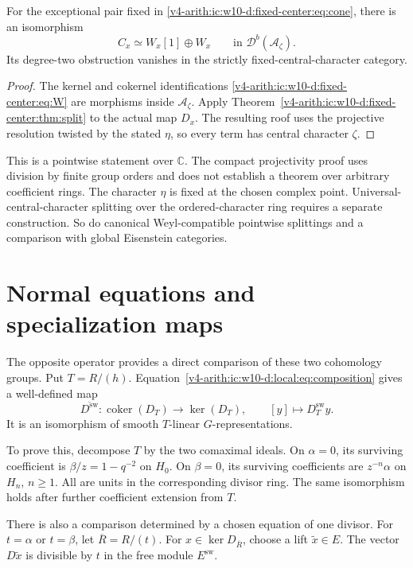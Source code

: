 \begin{proposition}\label{v4-arith:ic:w10-d:fixed-center:prop:application}
For the exceptional pair fixed in \eqref{v4-arith:ic:w10-d:fixed-center:eq:cone}, there is an isomorphism
\[
 C_x\simeq W_x[1]\oplus W_x
 \qquad\text{in }\mathcal D^b(\mathcal A_\zeta).
\]
Its degree-two obstruction vanishes in the strictly fixed-central-character category.
\end{proposition}
\begin{proof}
The kernel and cokernel identifications \eqref{v4-arith:ic:w10-d:fixed-center:eq:W} are morphisms inside $\mathcal A_\zeta$.
Apply Theorem~\ref{v4-arith:ic:w10-d:fixed-center:thm:split} to the actual map $D_x$.
The resulting roof uses the projective resolution twisted by the stated $\eta$,
so every term has central character $\zeta$.
\end{proof}

This is a pointwise statement over $\mathbb C$.
The compact projectivity proof uses division by finite group orders and does not establish a theorem over arbitrary coefficient rings.
The character $\eta$ is fixed at the chosen complex point.
Universal-central-character splitting over the ordered-character ring
requires a separate construction. So do canonical Weyl-compatible
pointwise splittings and a comparison with global Eisenstein categories.


\section{Normal equations and specialization maps}
The opposite operator provides a direct comparison of these two cohomology groups.
Put $T=R/(h)$.
Equation~\eqref{v4-arith:ic:w10-d:local:eq:composition} gives a well-defined map
\[
 \overline {D^\mathrm{sw}}:\operatorname{coker}(D_T)\longrightarrow\ker(D_T),
 \qquad [y]\longmapsto D^\mathrm{sw}_Ty.
\]
It is an isomorphism of smooth $T$-linear $G$-representations.

To prove this, decompose $T$ by the two comaximal ideals.
On $\alpha=0$, its surviving coefficient is $\beta/z=1-q^{-2}$ on $H_0$.
On $\beta=0$, its surviving coefficients are $z^{-n}\alpha$ on $H_n$, $n\ge1$.
All are units in the corresponding divisor ring.
The same isomorphism holds after further coefficient extension from $T$.

There is also a comparison determined by a chosen equation of one divisor.
For $t=\alpha$ or $t=\beta$, let $\overline R=R/(t)$.
For $x\in\ker D_{\overline R}$, choose a lift $\widetilde x\in E$.
The vector $D\widetilde x$ is divisible by $t$ in the free module $E^\mathrm{sw}$.

